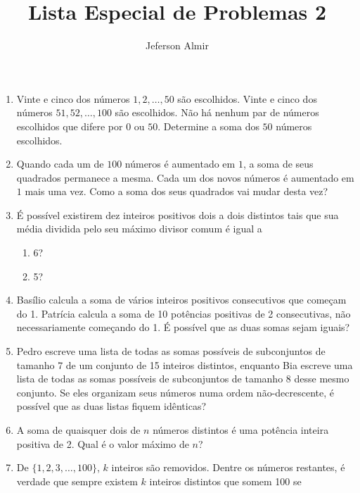 \documentclass{article}
\title{Lista Especial de Problemas 2}
\author{Jeferson Almir}
\date{}
\begin{document}
\maketitle

\begin{enumerate}
    \item Vinte e cinco dos números $1, 2, \dots, 50$ são escolhidos. Vinte e cinco dos números $51, 52, \dots, 100$ são escolhidos. Não há nenhum par de números escolhidos que difere por $0$ ou $50$. Determine a soma dos $50$ números escolhidos.

    \item Quando cada um de $100$ números é aumentado em $1$, a soma de seus quadrados permanece a mesma. Cada um dos novos números é aumentado em $1$ mais uma vez. Como a soma dos seus quadrados vai mudar desta vez?

    \item É possível existirem dez inteiros positivos dois a dois distintos tais que sua média dividida pelo seu máximo divisor comum é igual a

    \begin{enumerate}
        \item 6?

        \item 5?
    \end{enumerate}

    \item Basílio calcula a soma de vários inteiros positivos consecutivos que começam do 1. Patrícia calcula a soma de 10 potências positivas de 2 consecutivas, não necessariamente começando do 1. É possível que as duas somas sejam iguais?

    \item Pedro escreve uma lista de todas as somas possíveis de subconjuntos de tamanho 7 de um conjunto de 15 inteiros distintos, enquanto Bia escreve uma lista de todas as somas possíveis de subconjuntos de tamanho 8 desse mesmo conjunto. Se eles organizam seus números numa ordem não-decrescente, é possível que as duas listas fiquem idênticas?

    \item A soma de quaisquer dois de $n$ números distintos é uma potência inteira positiva de 2. Qual é o valor máximo de $n$?

    \item De $\{1,2,3,\dots,100\}$, $k$ inteiros são removidos. Dentre os números restantes, é verdade que sempre existem $k$ inteiros distintos que somem 100 se


\end{enumerate}
\end{document}
